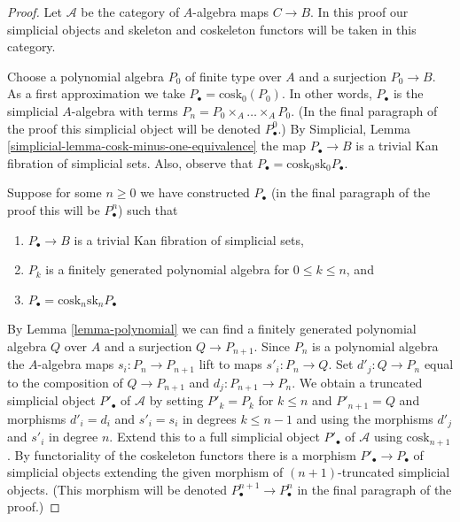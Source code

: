 \documentclass{stacks-project}
\theoremstyle{plain}
\theoremstyle{definition}
\theoremstyle{remark}
\numberwithin{equation}{subsection}
\begin{document}
\begin{proof}
Let $\mathcal{A}$ be the category of $A$-algebra maps $C \to B$.
In this proof our simplicial objects and skeleton and coskeleton
functors will be taken in this category.

\medskip\noindent
Choose a polynomial algebra $P_0$ of finite type over $A$ and a surjection
$P_0 \to B$. As a first approximation we take
$P_\bullet = \text{cosk}_0(P_0)$. In other words, $P_\bullet$ is the simplicial
$A$-algebra with terms $P_n = P_0 \times_A \ldots \times_A P_0$.
(In the final paragraph of the proof this simplicial object will
be denoted $P^0_\bullet$.) By
Simplicial, Lemma \ref{simplicial-lemma-cosk-minus-one-equivalence}
the map $P_\bullet \to B$ is a trivial Kan fibration of simplicial sets.
Also, observe that $P_\bullet = \text{cosk}_0 \text{sk}_0 P_\bullet$.

\medskip\noindent
Suppose for some $n \geq 0$ we have constructed $P_\bullet$
(in the final paragraph of the proof this will be $P^n_\bullet$)
such that
\begin{enumerate}
\item[(a)] $P_\bullet \to B$ is a trivial Kan fibration of simplicial sets,
\item[(b)] $P_k$ is a finitely generated polynomial algebra for
$0 \leq k \leq n$, and
\item[(c)] $P_\bullet = \text{cosk}_n \text{sk}_n P_\bullet$
\end{enumerate}
By Lemma \ref{lemma-polynomial}
we can find a finitely generated polynomial algebra $Q$ over $A$
and a surjection $Q \to P_{n + 1}$. Since $P_n$ is a polynomial algebra
the $A$-algebra maps $s_i : P_n \to P_{n + 1}$ lift to maps
$s'_i : P_n \to Q$. Set $d'_j : Q \to P_n$ equal to the composition of
$Q \to P_{n + 1}$ and $d_j : P_{n + 1} \to P_n$.
We obtain a truncated simplicial object $P'_\bullet$ of $\mathcal{A}$
by setting $P'_k = P_k$ for $k \leq n$ and $P'_{n + 1} = Q$ and morphisms
$d'_i = d_i$ and $s'_i = s_i$ in degrees $k \leq n - 1$ and using the
morphisms $d'_j$ and $s'_i$ in degree $n$. Extend this to a full simplicial
object $P'_\bullet$ of $\mathcal{A}$ using $\text{cosk}_{n + 1}$. By
functoriality of the coskeleton functors there is a morphism
$P'_\bullet \to P_\bullet$ of simplicial objects extending the
given morphism of $(n + 1)$-truncated simplicial objects.
(This morphism will be denoted $P^{n + 1}_\bullet \to P^n_\bullet$
in the final paragraph of the proof.)


\end{proof}
\end{document}
